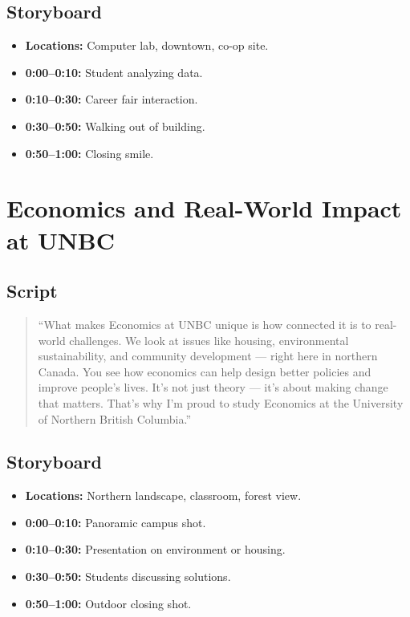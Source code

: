 \documentclass[12pt]{article}
\begin{document}
\subsection*{Storyboard}
\begin{itemize}[leftmargin=*]
    \item \textbf{Locations:} Computer lab, downtown, co-op site.
    \item \textbf{0:00–0:10:} Student analyzing data.
    \item \textbf{0:10–0:30:} Career fair interaction.
    \item \textbf{0:30–0:50:} Walking out of building.
    \item \textbf{0:50–1:00:} Closing smile.
\end{itemize}

\section{Economics and Real-World Impact at UNBC}

\subsection*{Script}
\begin{quote}
``What makes Economics at UNBC unique is how connected it is to real-world challenges. 
We look at issues like housing, environmental sustainability, and community development — right here in northern Canada. 
You see how economics can help design better policies and improve people’s lives. 
It’s not just theory — it’s about making change that matters. 
That’s why I’m proud to study Economics at the University of Northern British Columbia.''
\end{quote}

\subsection*{Storyboard}
\begin{itemize}[leftmargin=*]
    \item \textbf{Locations:} Northern landscape, classroom, forest view.
    \item \textbf{0:00–0:10:} Panoramic campus shot.
    \item \textbf{0:10–0:30:} Presentation on environment or housing.
    \item \textbf{0:30–0:50:} Students discussing solutions.
    \item \textbf{0:50–1:00:} Outdoor closing shot.
\end{itemize}
\end{document}
